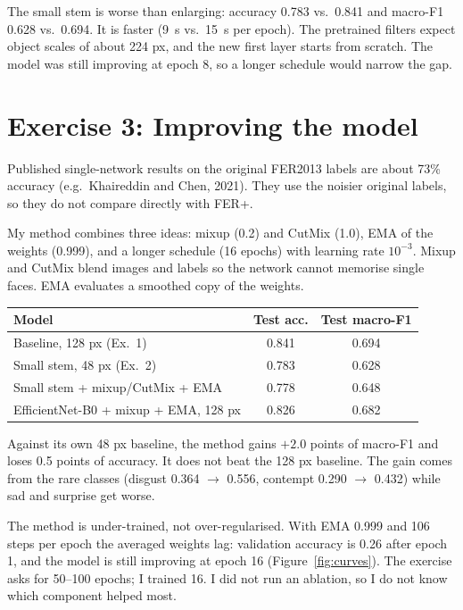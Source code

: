 \documentclass[11pt]{article}
\begin{document}
The small stem is worse than enlarging: accuracy 0.783 vs.\ 0.841 and macro-F1 0.628 vs.\ 0.694. It is faster (9~s vs.\ 15~s per epoch). The pretrained filters expect object scales of about 224 px, and the new first layer starts from scratch. The model was still improving at epoch 8, so a longer schedule would narrow the gap.

\section{Exercise 3: Improving the model}
Published single-network results on the original FER2013 labels are about 73\% accuracy (e.g.\ Khaireddin and Chen, 2021). %
They use the noisier original labels, so they do not compare directly with FER+.

My method combines three ideas: mixup (0.2) and CutMix (1.0), EMA of the weights (0.999), and a longer schedule (16 epochs) with learning rate $10^{-3}$. Mixup and CutMix blend images and labels so the network cannot memorise single faces. EMA evaluates a smoothed copy of the weights.

\begin{center}
\begin{tabular}{lcc}
\toprule
Model & Test acc. & Test macro-F1 \\
\midrule
Baseline, 128 px (Ex.~1) & 0.841 & 0.694 \\
Small stem, 48 px (Ex.~2) & 0.783 & 0.628 \\
Small stem + mixup/CutMix + EMA & 0.778 & 0.648 \\
EfficientNet-B0 + mixup + EMA, 128 px & 0.826 & 0.682 \\
\bottomrule
\end{tabular}
\end{center}

Against its own 48 px baseline, the method gains $+2.0$ points of macro-F1 and loses 0.5 points of accuracy. It does not beat the 128 px baseline. The gain comes from the rare classes (disgust 0.364 $\to$ 0.556, contempt 0.290 $\to$ 0.432) while sad and surprise get worse.

The method is under-trained, not over-regularised. With EMA 0.999 and 106 steps per epoch the averaged weights lag: validation accuracy is 0.26 after epoch 1, and the model is still improving at epoch 16 (Figure~\ref{fig:curves}). The exercise asks for 50--100 epochs; I trained 16. I did not run an ablation, so I do not know which component helped most.
\end{document}
